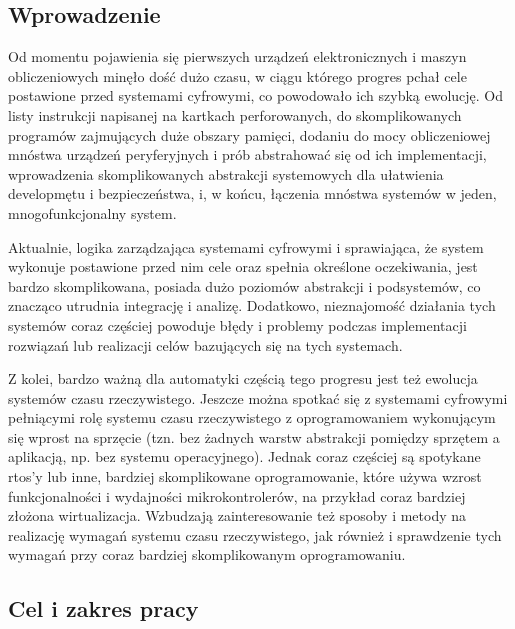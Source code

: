 \documentclass[../../main]{subfiles}
\begin{document}
\subsection{Wprowadzenie}

Od momentu pojawienia się pierwszych urządzeń elektronicznych i maszyn %
obliczeniowych minęło dość dużo czasu, w ciągu którego progres pchał cele %
postawione przed systemami cyfrowymi, co powodowało ich szybką ewolucję. Od listy instrukcji napisanej
na kartkach perforowanych, do skomplikowanych programów zajmujących duże obszary pamięci, dodaniu do
mocy obliczeniowej mnóstwa urządzeń peryferyjnych i prób abstrahować się od ich implementacji,
wprowadzenia skomplikowanych abstrakcji systemowych dla ułatwienia developmętu i %
bezpieczeństwa, i, w końcu, łączenia mnóstwa systemów w jeden, mnogofunkcjonalny system.

Aktualnie, logika zarządzająca systemami cyfrowymi i sprawiająca, że system wykonuje postawione przed
nim cele oraz spełnia określone oczekiwania, jest bardzo skomplikowana, posiada dużo poziomów
abstrakcji i podsystemów, co znacząco utrudnia integrację i analizę. Dodatkowo, nieznajomość działania
tych systemów coraz częściej powoduje błędy i problemy podczas %
implementacji rozwiązań lub realizacji celów bazujących się na tych systemach.

Z kolei, bardzo ważną dla automatyki częścią tego progresu jest też ewolucja systemów czasu
rzeczywistego. Jeszcze można spotkać się z systemami cyfrowymi pełniącymi rolę systemu czasu
rzeczywistego z oprogramowaniem wykonującym się wprost na sprzęcie (tzn. bez żadnych warstw abstrakcji
pomiędzy sprzętem a aplikacją, np. bez systemu operacyjnego). Jednak coraz częściej są spotykane
\acrshort{rtos}'y lub inne, bardziej skomplikowane oprogramowanie, które używa wzrost funkcjonalności i
wydajności mikrokontrolerów, na przykład coraz bardziej złożona wirtualizacja. %
Wzbudzają zainteresowanie też sposoby i metody na realizację wymagań systemu czasu rzeczywistego, jak
również i sprawdzenie tych wymagań przy coraz bardziej skomplikowanym oprogramowaniu.

\subsection{Cel i zakres pracy}
\end{document}
